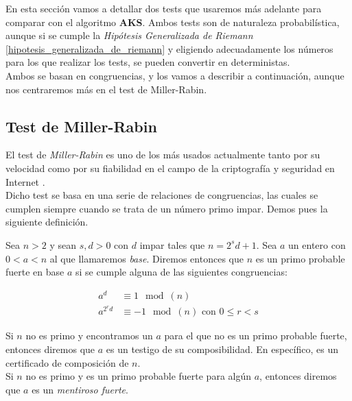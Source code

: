 En esta sección vamos a detallar dos tests que usaremos más adelante para comparar con el algoritmo \textbf{AKS}. Ambos tests son de naturaleza probabilística, aunque si se cumple la \textit{Hipótesis Generalizada de Riemann} \ref{hipotesis_generalizada_de_riemann} y eligiendo adecuadamente los números para los que realizar los tests, se pueden convertir en deterministas.\\

Ambos se basan en congruencias, y los vamos a describir a continuación, aunque nos centraremos más en el test de Miller-Rabin.

\subsection{Test de Miller-Rabin}

El test de \textit{Miller-Rabin} es uno de los más usados actualmente tanto por su velocidad como por su fiabilidad en el campo de la criptografía y seguridad en Internet \cite{digital_signature_standard}.\\

Dicho test se basa en una serie de relaciones de congruencias, las cuales se cumplen siempre cuando se trata de un número primo impar. Demos pues la siguiente definición.\\

\begin{definicion}
	Sea $n > 2$ y sean $s, d > 0$ con $d$ impar tales que $n = 2^s d + 1$. Sea $a$ un entero con $0 < a < n$ al que llamaremos \textit{base}. Diremos entonces que $n$ es un primo probable fuerte en base $a$ si se cumple alguna de las siguientes congruencias:
	
	\begin{align}\label{congruencias_miller_rabin}
	a^d &\equiv 1 \mod(n)\\
	a^{2^r d} &\equiv -1 \mod(n)\text{ con $0 \leq r < s$}
	\end{align}
\end{definicion}

Si $n$ no es primo y encontramos un $a$ para el que no es un primo probable fuerte, entonces diremos que $a$ es un testigo de su composibilidad. En específico, es un certificado de composición de $n$.\\

Si $n$ no es primo y es un primo probable fuerte para algún $a$, entonces diremos que $a$ es un \textit{mentiroso fuerte}.\\

